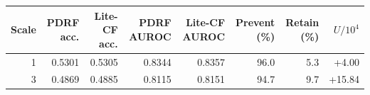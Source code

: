 \begin{tabular}{rrrrrrrr}
\toprule
Scale & PDRF acc. & Lite-CF acc. & PDRF AUROC & Lite-CF AUROC & Prevent (\%) & Retain (\%) & $U/10^4$ \\
\midrule
1 & 0.5301 & 0.5305 & 0.8344 & 0.8357 & 96.0 & 5.3 & +4.00 \\
3 & 0.4869 & 0.4885 & 0.8115 & 0.8151 & 94.7 & 9.7 & +15.84 \\
\bottomrule
\end{tabular}
